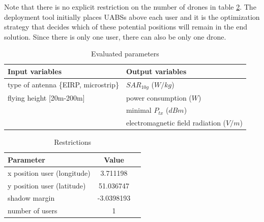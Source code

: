 Note that there is no explicit restriction on the number of drones in table \ref{table:S1:restrictions}. The deployment tool initially places 
\gls{UABS}s above each user and it is the optimization strategy that decides which of these potential positions will remain in the end solution.
Since there is only one user, there can also be only one drone.
\begin{table}[!htb]
\centering
            \begin{tabular}{|l|l|}
            \hline
            \textbf{Input variables  }                    & \textbf{Output variables}          \\   \hline 
            type of antenna \{EIRP, microstrip\}            & $SAR_{10g}$  ($W/kg$)            \\ 
            flying height [20m-200m]                        & power consumption  ($W$)           \\ 
                                                          &  minimal $P_{tx}$ ($dBm$)\\ 
                                                          & electromagnetic field radiation ($V/m$)\\
            \hline
            \end{tabular} 
            \caption{Evaluated parameters}
          \label{table:s1:evalpara}
\end{table}
\begin{table}[!htb]
\centering
        \begin{tabular}{|l|c|l|}
        \hline
        \textbf{Parameter}              & \textbf{Value}          \\   \hline 
        x position user (longitude)              & 3.711198       \\    
        y position user (latitude)               & 51.036747          \\ 
        shadow margin             & -3.0398193 \\
        number of users                & 1 \\
        \hline
        \end{tabular}
        \caption{Restrictions}
        \label{table:S1:restrictions}
\end{table}


